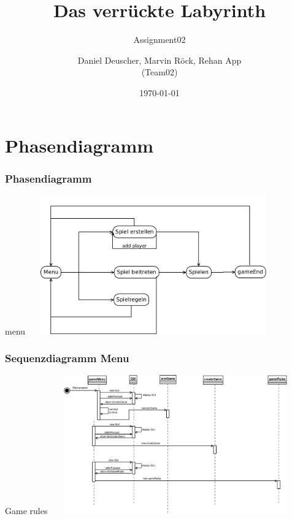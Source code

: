 \documentclass{beamer}
\begin{document}
	\title[]{Das verrückte Labyrinth}	
	\subtitle{Assignment02}
	\author{Daniel Deuscher, Marvin Röck, Rehan App\\ (Team02)}
	\date{\today}
	 
	\begin{frame}
		\maketitle
	\end{frame}
	 
	\section{Phasendiagramm }
	    \label{Frame1}	
		\begin{frame}
			\frametitle{Phasendiagramm}
			\begin{block}{menu}
				\includegraphics[width = 10.8cm, height = 6cm]{aufgabe1/Phasendiagramm.jpeg}
			\end{block}		
		\end{frame}

	    \label{Frame2}	
		\begin{frame}
			\frametitle{Sequenzdiagramm Menu}
			\begin{block}{Game rules}
				\includegraphics[width = 10.8cm, height = 6cm]{aufgabe1/SequenzdiagrammMenu.jpeg}
			\end{block}		
		\end{frame}
\end{document}
